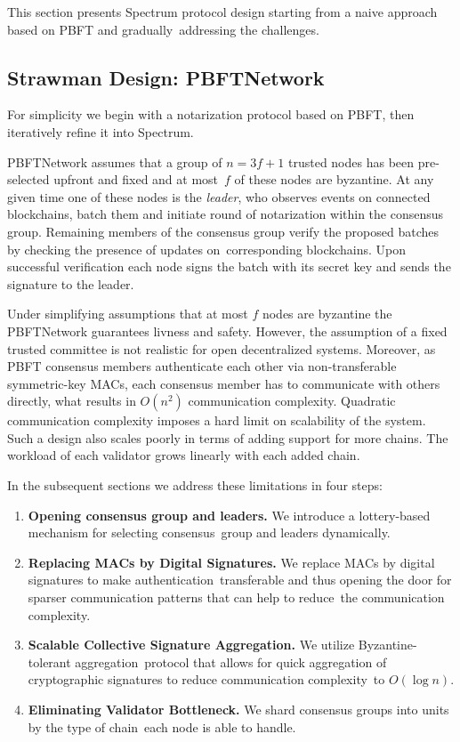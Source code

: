 This section presents Spectrum protocol design starting from a naive approach based on PBFT and gradually\
addressing the challenges.

\subsection{Strawman Design: PBFTNetwork}\label{subsec:strawman-design}

For simplicity we begin with a notarization protocol based on PBFT, then iteratively refine it into Spectrum.

PBFTNetwork assumes that a group of ${n = 3f + 1}$ trusted nodes has been pre-selected upfront and fixed and at most\
$f$ of these nodes are byzantine.
At any given time one of these nodes is the \emph{leader}, who observes events on connected blockchains,
batch them and initiate round of notarization within the consensus group.
Remaining members of the consensus group verify the proposed batches by checking the presence of updates on\
corresponding blockchains.
Upon successful verification each node signs the batch with its secret key and sends the signature to the leader.

Under simplifying assumptions that at most $f$ nodes are byzantine the PBFTNetwork guarantees livness and safety.
However, the assumption of a fixed trusted committee is not realistic for open decentralized systems.
Moreover, as PBFT consensus members authenticate each other via non-transferable symmetric-key MACs, each consensus
member has to communicate with others directly, what results in $O(n^2)$ communication complexity.
Quadratic communication complexity imposes a hard limit on scalability of the system.
Such a design also scales poorly in terms of adding support for more chains.
The workload of each validator grows linearly with each added chain.

In the subsequent sections we address these limitations in four steps:
\begin{enumerate}
    \item \textbf{Opening consensus group and leaders.} We introduce a lottery-based mechanism for selecting consensus\
    group and leaders dynamically.
    \item \textbf{Replacing MACs by Digital Signatures.} We replace MACs by digital signatures to make authentication\
    transferable and thus opening the door for sparser communication patterns that can help to reduce\
    the communication complexity.
    \item \textbf{Scalable Collective Signature Aggregation.} We utilize Byzantine-tolerant aggregation\
    protocol that allows for quick aggregation of cryptographic signatures to reduce communication complexity\
    to $O(\log n)$.
    \item \textbf{Eliminating Validator Bottleneck.} We shard consensus groups into units by the type of chain\
    each node is able to handle.
\end{enumerate}

